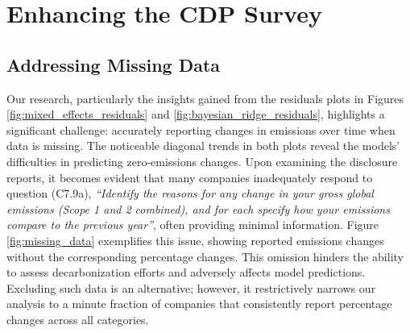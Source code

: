 


\section{Enhancing the CDP Survey}

\subsection{Addressing Missing Data}
Our research, particularly the insights gained from the residuals plots in Figures \ref{fig:mixed_effects_residuals} and \ref{fig:bayesian_ridge_residuals}, highlights a significant challenge: accurately reporting changes in emissions over time when data is missing. The noticeable diagonal trends in both plots reveal the models' difficulties in predicting zero-emissions changes. Upon examining the disclosure reports, it becomes evident that many companies inadequately respond to question (C7.9a), \textit{``Identify the reasons for any change in your gross global emissions (Scope 1 and 2 combined), and for each specify how your emissions compare to the previous year''}, often providing minimal information. Figure \ref{fig:missing_data} exemplifies this issue, showing reported emissions changes without the corresponding percentage changes. This omission hinders the ability to assess decarbonization efforts and adversely affects model predictions. Excluding such data is an alternative; however, it restrictively narrows our analysis to a minute fraction of companies that consistently report percentage changes across all categories.

